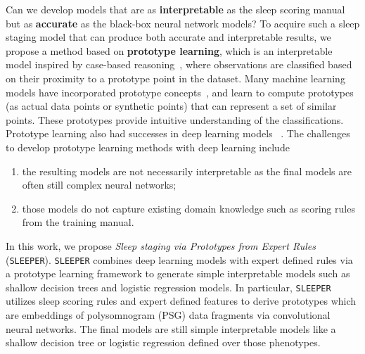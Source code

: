 \documentclass[pmlr]{jmlr}
\newcommand{\mname}
{\texttt{SLEEPER}\xspace}
\begin{document}
Can we develop models that are as {\bf interpretable} as the sleep scoring manual but as {\bf accurate} as the black-box neural network models? 
To acquire such a sleep staging model that can produce both accurate and interpretable results, we propose a method based on {\bf prototype learning}, which is an interpretable model inspired by case-based reasoning~\citep{kolodner1992introduction}, where observations are classified based on their proximity to a prototype point in the dataset.  Many machine learning models have incorporated prototype concepts~\citep{priebe2003classification,bien2011prototype,kim2014bayesian}, and  learn to compute prototypes (as actual data points or synthetic points) that can represent a set of similar points. These prototypes provide intuitive understanding of the classifications. Prototype learning also had successes in deep learning models  ~\citep{DBLP:journals/corr/SnellSZ17,DBLP:journals/corr/abs-1710-04806}. The challenges to develop prototype learning methods with deep learning include  
\begin{enumerate}
    \item the resulting models are not necessarily interpretable as the final models are often still complex neural networks;
    \item those models do not capture existing domain knowledge such as scoring rules from the training manual. 
\end{enumerate}




In this work, we propose {\it Sleep staging via Prototypes from Expert Rules} (\mname). 
\mname combines deep learning models with expert defined rules via a prototype learning framework to generate simple interpretable models such as shallow decision trees and logistic regression models.
In particular, \mname utilizes sleep scoring rules and expert defined features to derive prototypes which are embeddings of  polysomnogram (PSG) data fragments via convolutional neural networks. The final models are still simple interpretable models like a shallow decision tree or logistic regression defined over those phenotypes. 
\end{document}
